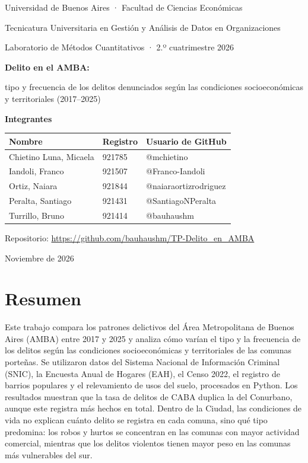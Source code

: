 \documentclass[11pt,a4paper]{article}
\begin{document}
\begin{titlepage}
\centering
{\large Universidad de Buenos Aires · Facultad de Ciencias Económicas\par}
{\large Tecnicatura Universitaria en Gestión y Análisis de Datos en Organizaciones\par}
\vspace{0.6cm}
{\large Laboratorio de Métodos Cuantitativos · 2.º cuatrimestre 2026\par}
\vspace{3cm}
{\LARGE\bfseries Delito en el AMBA:\par}
\vspace{0.3cm}
{\Large tipo y frecuencia de los delitos denunciados según las condiciones socioeconómicas y territoriales (2017--2025)\par}
\vspace{2.5cm}
{\large\bfseries Integrantes\par}
\vspace{0.4cm}
\begin{tabular}{lll}
\toprule
Nombre & Registro & Usuario de GitHub \\
\midrule
Chietino Luna, Micaela & 921785 & @mchietino \\
Iandoli, Franco & 921507 & @Franco-Iandoli \\
Ortiz, Naiara & 921844 & @naiaraortizrodriguez \\
Peralta, Santiago & 921431 & @SantiagoNPeralta \\
Turrillo, Bruno & 921414 & @bauhaushm \\
\bottomrule
\end{tabular}
\vfill
{Repositorio: \url{https://github.com/bauhaushm/TP-Delito_en_AMBA}\par}
\vspace{0.3cm}
{Noviembre de 2026\par}
\end{titlepage}

\section*{Resumen}
Este trabajo compara los patrones delictivos del Área Metropolitana de Buenos Aires (AMBA) entre 2017 y 2025 y analiza cómo varían el tipo y la frecuencia de los delitos según las condiciones socioeconómicas y territoriales de las comunas porteñas. Se utilizaron datos del Sistema Nacional de Información Criminal (SNIC), la Encuesta Anual de Hogares (EAH), el Censo 2022, el registro de barrios populares y el relevamiento de usos del suelo, procesados en Python. Los resultados muestran que la tasa de delitos de CABA duplica la del Conurbano, aunque este registra más hechos en total. Dentro de la Ciudad, las condiciones de vida no explican cuánto delito se registra en cada comuna, sino qué tipo predomina: los robos y hurtos se concentran en las comunas con mayor actividad comercial, mientras que los delitos violentos tienen mayor peso en las comunas más vulnerables del sur.
\end{document}
